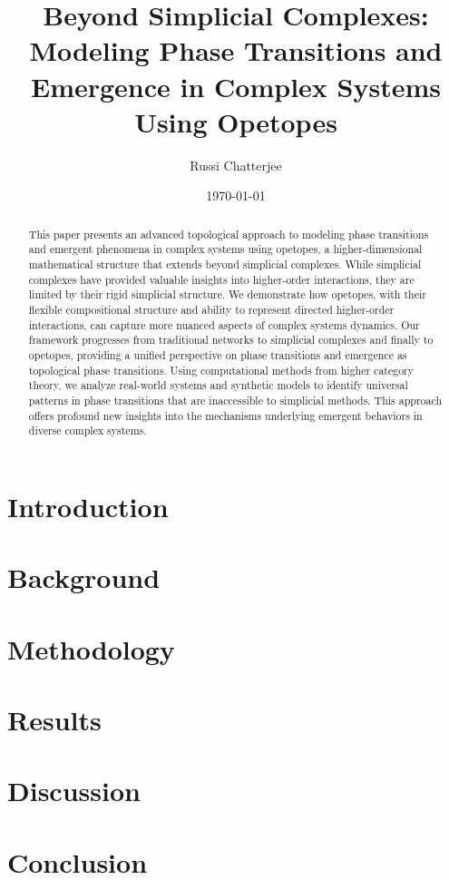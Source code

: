 \documentclass[12pt,a4paper]{article}
\title{Beyond Simplicial Complexes: Modeling Phase Transitions and Emergence in Complex Systems Using Opetopes}
\author{Russi Chatterjee}
\date{\today}
\begin{document}
\maketitle

\thispagestyle{empty}

\begin{abstract}
\noindent
This paper presents an advanced topological approach to modeling phase transitions and emergent phenomena in complex systems using opetopes, a higher-dimensional mathematical structure that extends beyond simplicial complexes. While simplicial complexes have provided valuable insights into higher-order interactions, they are limited by their rigid simplicial structure. We demonstrate how opetopes, with their flexible compositional structure and ability to represent directed higher-order interactions, can capture more nuanced aspects of complex systems dynamics. Our framework progresses from traditional networks to simplicial complexes and finally to opetopes, providing a unified perspective on phase transitions and emergence as topological phase transitions. Using computational methods from higher category theory, we analyze real-world systems and synthetic models to identify universal patterns in phase transitions that are inaccessible to simplicial methods. This approach offers profound new insights into the mechanisms underlying emergent behaviors in diverse complex systems.
\end{abstract}

\vspace{1cm}
\section{Introduction}


\section{Background}


\section{Methodology}


\section{Results}


\section{Discussion}


\section{Conclusion}




\end{document}
